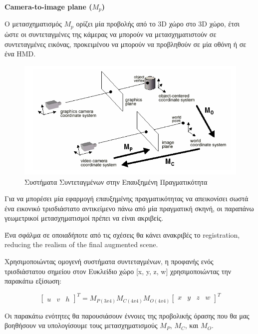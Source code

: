 \textbf{Camera-to-image plane ($M_{p}$)}

Ο μετασχηματισμός $M_{p}$ ορίζει μία προβολής από το 3D χώρο στο 3D χώρο, έτσι ώστε οι συντεταγμένες της κάμερας να μπορούν να μετασχηματιστούν σε συντεταγμένες εικόνας, προκειμένου να μπορούν να προβληθούν σε μία οθόνη ή σε ένα HMD.


\begin{figure}[H]
    \centering
    \includegraphics[scale=1.3, angle=0]{Files/Figures/coordinatesystems.png}
    \caption[Συστήματα Συντεταγμένων στην Επαυξημένη Πραγματικότητα]{Συστήματα Συντεταγμένων στην Επαυξημένη Πραγματικότητα}
    \label{fig:coordinatesystems}
\end{figure}

Για να μπορέσει μία εφαρμογή επαυξημένης πραγματικότητας να απεικονίσει σωστά ένα εικονικό τρισδιάστατο αντικείμενο πάνω από μία πραγματική σκηνή, οι παραπάνω γεωμετρικοί μετασχηματισμοί πρέπει να είναι ακριβείς.

Ένα σφάλμα σε οποιαδήποτε από τις σχέσεις θα κάνει ανακριβές το registration, reducing the realism of the final augmented scene.

Χρησιμοποιώντας ομογενή συστήματα συντεταγμένων, η προφανής ενός τρισδιάστατου σημείου στον Ευκλείδιο χώρο [x, y, z, w] χρησιμοποιώντας την παρακάτω εξίσωση:

\begin{equation}
\begin{bmatrix}
u & v & h
\end{bmatrix}
^{T}=
M_{P(3x4)}M_{C(4x4)}M_{O(4x4)}
\begin{bmatrix}
x & y & z & w
\end{bmatrix}
^{T}
\end{equation}

Οι παρακάτω ενότητες θα παρουσιάσουν έννοιες της προβολικής όρασης που θα μας βοηθήσουν να υπολογίσουμε τους μετασχηματισμούς 
$M_{P}$, $M_{C}$, και $M_{O}$.



